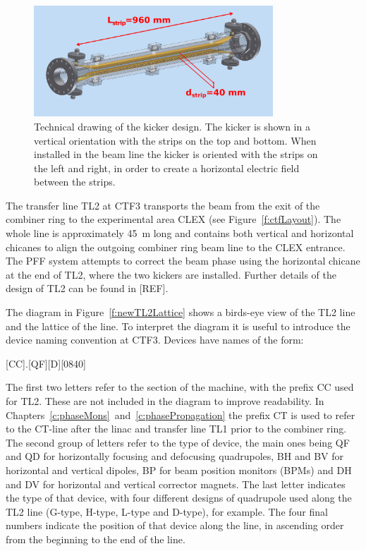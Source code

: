 \begin{figure}
  \centering
  \includegraphics[width=0.8\textwidth]{Figures/optics/kickerSchematic}
  \caption{Technical drawing of the kicker design. The kicker is shown in a vertical orientation with the strips on the top and bottom. When installed in the beam line the kicker is oriented with the strips on the left and right, in order to create a horizontal electric field between the strips.}
  \label{f:kickerSchematic}
\end{figure}


The transfer line TL2 at CTF3 transports the beam from the exit of the combiner ring to the experimental area CLEX (see Figure~\ref{f:ctfLayout}). The whole line is approximately 45~m long and contains both vertical and horizontal chicanes to align the outgoing combiner ring beam line to the CLEX entrance. The PFF system attempts to correct the beam phase using the horizontal chicane at the end of TL2, where the two kickers are installed. Further details of the design of TL2 can be found in [REF].

The diagram in Figure~\ref{f:newTL2Lattice} shows a birds-eye view of the TL2 line and the lattice of the line. To interpret the diagram it is useful to introduce the device naming convention at CTF3. Devices have names of the form:
\begin{center}
[CC].[QF][D][0840]
\end{center}
The first two letters refer to the section of the machine, with the prefix CC used for TL2. These are not included in the diagram to improve readability. In Chapters~\ref{c:phaseMons}~and~\ref{c:phasePropagation} the prefix CT is used to refer to the CT-line after the linac and transfer line TL1 prior to the combiner ring. The second group of letters refer to the type of device, the main ones being QF and QD for horizontally focusing and defocusing quadrupoles, BH and BV for horizontal and vertical dipoles, BP for beam position monitors (BPMs) and DH and DV for horizontal and vertical corrector magnets. The last letter indicates the type of that device, with four different designs of quadrupole used along the TL2 line (G-type, H-type, L-type and D-type), for example. The four final numbers indicate the position of that device along the line, in ascending order from the beginning to the end of the line.

